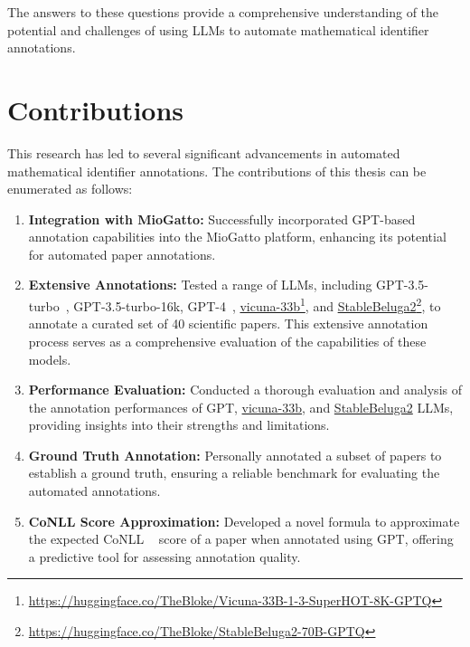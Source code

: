 The answers to these questions provide a comprehensive understanding of the potential and challenges of using LLMs to automate mathematical identifier annotations.

\section{Contributions}

This research has led to several significant advancements in automated mathematical identifier annotations. The contributions of this thesis can be enumerated as follows:

\begin{enumerate}
    \item \textbf{Integration with MioGatto:} Successfully incorporated GPT-based annotation capabilities into the MioGatto platform, enhancing its potential for automated paper annotations.
    
    \item \textbf{Extensive Annotations:} Tested a range of LLMs, including GPT-3.5-turbo~\citep{openai2023}, GPT-3.5-turbo-16k, GPT-4~\citep{2303.08774}, \href{https://huggingface.co/TheBloke/Vicuna-33B-1-3-SuperHOT-8K-GPTQ}{vicuna-33b}\footnote{\url{https://huggingface.co/TheBloke/Vicuna-33B-1-3-SuperHOT-8K-GPTQ}}\citep{zheng2023judging}, and \href{https://huggingface.co/TheBloke/StableBeluga2-70B-GPTQ}{StableBeluga2}\footnote{\url{https://huggingface.co/TheBloke/StableBeluga2-70B-GPTQ}}\citep{StableBelugaModels, touvron2023llama, mukherjee2023orca}, to annotate a curated set of 40 scientific papers. This extensive annotation process serves as a comprehensive evaluation of the capabilities of these models.
    
    \item \textbf{Performance Evaluation:} Conducted a thorough evaluation and analysis of the annotation performances of GPT, \href{https://huggingface.co/TheBloke/Vicuna-33B-1-3-SuperHOT-8K-GPTQ}{vicuna-33b}, and \href{https://huggingface.co/TheBloke/StableBeluga2-70B-GPTQ}{StableBeluga2} LLMs, providing insights into their strengths and limitations.
    
    \item \textbf{Ground Truth Annotation:} Personally annotated a subset of papers to establish a ground truth, ensuring a reliable benchmark for evaluating the automated annotations.
    
    \item \textbf{CoNLL Score Approximation:} Developed a novel formula to approximate the expected CoNLL ~\citep{pradhan2012conll} score of a paper when annotated using GPT, offering a predictive tool for assessing annotation quality.
\end{enumerate}


